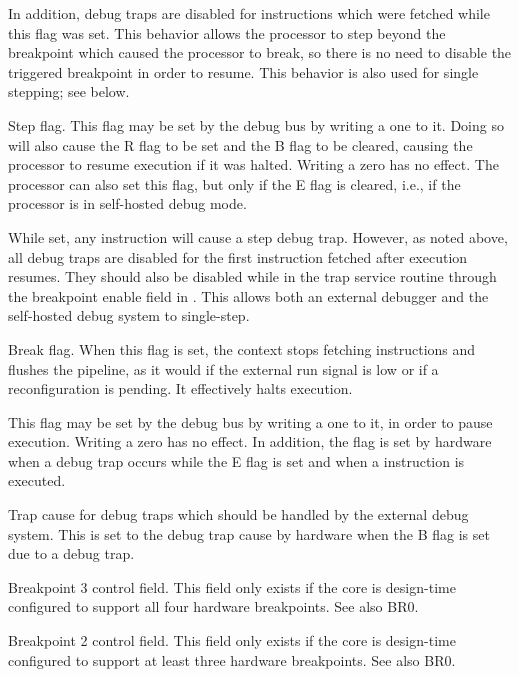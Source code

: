 In addition, debug traps are disabled for instructions which were fetched while
this flag was set. This behavior allows the processor to step beyond the
breakpoint which caused the processor to break, so there is no need to disable
the triggered breakpoint in order to resume. This behavior is also used for
single stepping; see below.

\debugCanWrite{}
\coreCanWrite{}

Step flag. This flag may be set by the debug bus by writing a one to it. Doing
so will also cause the R flag to be set and the B flag to be cleared, causing
the processor to resume execution if it was halted. Writing a zero has no
effect. The processor can also set this flag, but only if the E flag is cleared,
i.e., if the processor is in self-hosted debug mode.

While set, any instruction will cause a step debug trap. However, as noted
above, all debug traps are disabled for the first instruction fetched after
execution resumes. They should also be disabled while in the trap service
routine through the breakpoint enable field in . This allows both an
external debugger and the self-hosted debug system to single-step.

\debugCanWrite{}

Break flag. When this flag is set, the context stops fetching instructions and
flushes the pipeline, as it would if the external run signal is low or if a
reconfiguration is pending. It effectively halts execution.

This flag may be set by the debug bus by writing a one to it, in order to pause
execution. Writing a zero has no effect. In addition, the flag is set by
hardware when a debug trap occurs while the E flag is set and when a 
instruction is executed.


Trap cause for debug traps which should be handled by the external debug system.
This is set to the debug trap cause by hardware when the B flag is set due to a
debug trap.

\debugCanWrite{}
\coreCanWrite{}

Breakpoint 3 control field. This field only exists if the core is design-time
configured to support all four hardware breakpoints. See also BR0.

\debugCanWrite{}
\coreCanWrite{}

Breakpoint 2 control field. This field only exists if the core is design-time
configured to support at least three hardware breakpoints. See also BR0.

